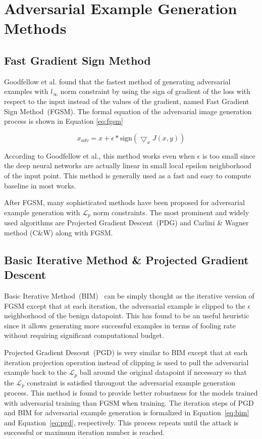 \section{Adversarial Example Generation Methods}\label{section:methods}


\subsection{Fast Gradient Sign Method}

Goodfellow et al.\cite{goodfellow2014explaining} found that the fastest method of generating adversarial examples with \(l_\infty\) norm constraint by using the sign of gradient of the loss with respect to the input instead of the values of the gradient, named Fast Gradient Sign Method~(FGSM). The formal equation of the adversarial image generation process is shown in Equation \ref{eq:fgsm}

\begin{equation}
    \label{eq:fgsm}
    x_{adv} = x + \epsilon * \text{sign}(\bigtriangledown_{x}J(x,y))
\end{equation}

According to Goodfellow et al., this method works even when \(\epsilon\) is too small since the deep neural networks are actually linear in small local epsilon neighborhood of the input point. This method is generally used as a fast and easy to compute baseline in most works.

After FGSM, many sophisticated methods have been proposed for adversarial example generation with \(\mathcal{L}_p\) norm constraints. The most prominent and widely used algorithms are Projected Gradient Descent~(PDG) and Carlini \& Wagner method (C\&W) along with FGSM.

\subsection{Basic Iterative Method \& Projected Gradient Descent}
Basic Iterative Method~(BIM)~\cite{kurakin2018adversarialphys} can be simply thought as the iterative version of FGSM except that at each iteration, the adversarial example is clipped to the \(\epsilon\) neighborhood of the benign datapoint. This has found to be an useful heuristic since it allows generating more successful examples in terms of fooling rate without requiring significant computational budget.

Projected Gradient Descent~(PGD) \cite{madry2017towards} is very similar to BIM except that at each iteration projection operation instead of clipping is used to pull the adversarial example back to the \(\mathcal{L}_p\) ball around the original datapoint if necessary so that the \(\mathcal{L}_p\) constraint is satisfied througout the adversarial example generation process. This method is found to provide better robustness for the models trained with adversarial training than FGSM when training. The iteration steps of PGD and BIM for adversarial example generation is formalized in Equation~\ref{eq:bim} and Equation~\ref{eq:pgd}, respectively. This process repeats until the attack is successful or maximum iteration number is reached.

